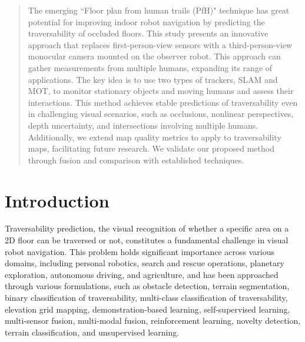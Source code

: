 \documentclass[letterpaper, 10 pt, conference]{ieeeconf}
\begin{document}
\maketitle

\begin{abstract}
The emerging ``Floor plan from human trails (PfH)" technique has great potential for improving indoor robot navigation by predicting the traversability of occluded floors. This study presents an innovative approach that replaces first-person-view sensors with a third-person-view monocular camera mounted on the observer robot. This approach can gather measurements from multiple humans, expanding its range of applications. The key idea is to use two types of trackers, SLAM and MOT, to monitor stationary objects and moving humans and assess their interactions. This method achieves stable predictions of traversability even in challenging visual scenarios, such as occlusions, nonlinear perspectives, depth uncertainty, and intersections involving multiple humans. Additionally, we extend map quality metrics to apply to traversability maps, facilitating future research. We validate our proposed method through fusion and comparison with established techniques.
\end{abstract}


\IEEEpeerreviewmaketitle



\section{Introduction}

Traversability prediction, the visual recognition of whether a specific area on a 2D floor can be traversed or not, constitutes a fundamental challenge in visual robot navigation. This problem holds significant importance across various domains, including personal robotics, search and rescue operations, planetary exploration, autonomous driving, and agriculture, and has been approached through various formulations, such as obstacle detection\cite{r2}, terrain segmentation\cite{r4}, binary classification of traversability\cite{r5}, multi-class classification of traversability\cite{r6}, elevation grid mapping\cite{r7}, demonstration-based learning\cite{r8}, self-supervised learning\cite{r9}, multi-sensor fusion\cite{r10}, multi-modal fusion\cite{r11}, reinforcement learning\cite{r12}, novelty detection\cite{r13}, terrain classification\cite{r14}, and unsupervised learning\cite{r15}.
\end{document}
